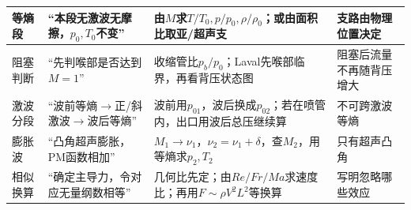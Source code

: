\documentclass[UTF8,a4paper]{ctexart}
\begin{document}
\begin{tabular}{|L{0.16\textwidth}|L{0.25\textwidth}|L{0.36\textwidth}|L{0.18\textwidth}|}\hline
等熵段 & “本段无激波无摩擦，$p_0,T_0$不变” & 由$M$求$T/T_0,p/p_0,\rho/\rho_0$；或由面积比取亚/超声支 & 支路由物理位置决定\\\hline
阻塞判断 & “先判喉部是否达到$M=1$” & 收缩管比$p_b/p_0$；Laval先喉部临界，再看背压状态图 & 阻塞后流量不再随背压增大\\\hline
激波分段 & “波前等熵$\to$正/斜激波$\to$波后等熵” & 波前用$p_{01}$，波后换成$p_{02}$；若在喷管内，出口用波后总压继续算 & 不可跨激波等熵\\\hline
膨胀波 & “凸角超声膨胀，PM函数相加” & $M_1\to\nu_1$，$\nu_2=\nu_1+\delta$，查$M_2$，用等熵求$p_2,T_2$ & 只有超声凸角\\\hline
相似换算 & “确定主导力，令对应无量纲数相等” & 几何比先定；由$Re/Fr/Ma$求速度比；再用$F\sim\rho V^2L^2$等换算 & 写明忽略哪些效应\\\hline
\end{tabular}
\end{document}
